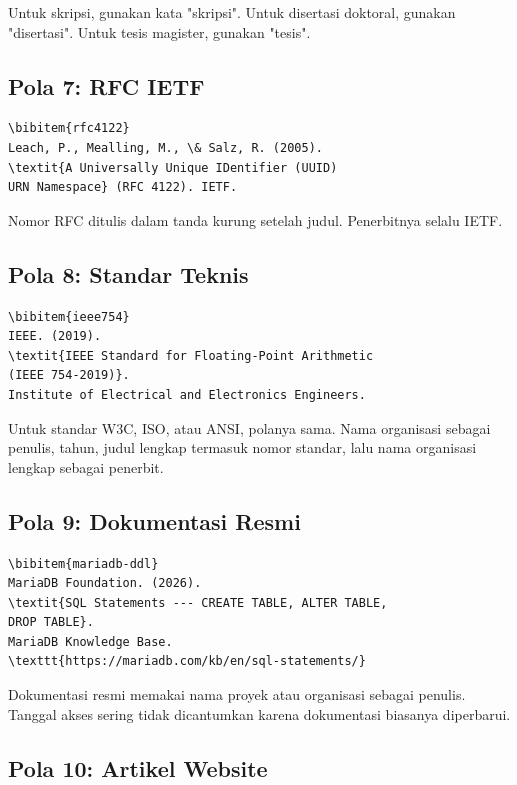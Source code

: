 \documentclass[11pt,a4paper]{article}
\begin{document}
Untuk skripsi, gunakan kata "skripsi". Untuk disertasi doktoral, gunakan "disertasi". Untuk tesis magister, gunakan "tesis".

\subsection{Pola 7: RFC IETF}

\begin{lstlisting}[style=code]
\bibitem{rfc4122}
Leach, P., Mealling, M., \& Salz, R. (2005).
\textit{A Universally Unique IDentifier (UUID)
URN Namespace} (RFC 4122). IETF.
\end{lstlisting}

Nomor RFC ditulis dalam tanda kurung setelah judul. Penerbitnya selalu IETF.

\subsection{Pola 8: Standar Teknis}

\begin{lstlisting}[style=code]
\bibitem{ieee754}
IEEE. (2019).
\textit{IEEE Standard for Floating-Point Arithmetic
(IEEE 754-2019)}.
Institute of Electrical and Electronics Engineers.
\end{lstlisting}

Untuk standar W3C, ISO, atau ANSI, polanya sama. Nama organisasi sebagai penulis, tahun, judul lengkap termasuk nomor standar, lalu nama organisasi lengkap sebagai penerbit.

\subsection{Pola 9: Dokumentasi Resmi}

\begin{lstlisting}[style=code]
\bibitem{mariadb-ddl}
MariaDB Foundation. (2026).
\textit{SQL Statements --- CREATE TABLE, ALTER TABLE,
DROP TABLE}.
MariaDB Knowledge Base.
\texttt{https://mariadb.com/kb/en/sql-statements/}
\end{lstlisting}

Dokumentasi resmi memakai nama proyek atau organisasi sebagai penulis. Tanggal akses sering tidak dicantumkan karena dokumentasi biasanya diperbarui.

\subsection{Pola 10: Artikel Website}
\end{document}
